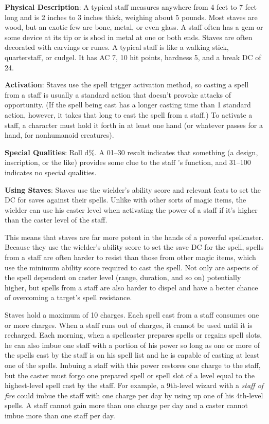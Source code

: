 \textbf{Physical Description}: A typical staff measures anywhere from 4 feet to 7 feet long and is 2 inches to 3 inches thick, weighing about 5 pounds. Most staves are wood, but an exotic few are bone, metal, or even glass. A staff often has a gem or some device at its tip or is shod in metal at one or both ends. Staves are often decorated with carvings or runes. A typical staff is like a walking stick, quarterstaff, or cudgel. It has AC 7, 10 hit points, hardness 5, and a break DC of 24.
				
\textbf{Activation}: Staves use the spell trigger activation method, so casting a spell from a staff is usually a standard action that doesn't provoke attacks of opportunity. (If the spell being cast has a longer casting time than 1 standard action, however, it takes that long to cast the spell from a staff.) To activate a staff, a character must hold it forth in at least one hand (or whatever passes for a hand, for nonhumanoid creatures).
				
\textbf{Special Qualities}: Roll d\%. A 01--30 result indicates that something (a design, inscription, or the like) provides some clue to the staff 's function, and 31--100 indicates no special qualities.
				
\textbf{Using Staves}: Staves use the wielder's ability score and relevant feats to set the DC for saves against their spells. Unlike with other sorts of magic items, the wielder can use his caster level when activating the power of a staff if it's higher than the caster level of the staff. 
				
This means that staves are far more potent in the hands of a powerful spellcaster. Because they use the wielder's ability score to set the save DC for the spell, spells from a staff are often harder to resist than those from other magic items, which use the minimum ability score required to cast the spell. Not only are aspects of the spell dependent on caster level (range, duration, and so on) potentially higher, but spells from a staff are also harder to dispel and have a better chance of overcoming a target's spell resistance.
				
Staves hold a maximum of 10 charges. Each spell cast from a staff consumes one or more charges. When a staff runs out of charges, it cannot be used until it is recharged. Each morning, when a spellcaster prepares spells or regains spell slots, he can also imbue one staff with a portion of his power so long as one or more of the spells cast by the staff is on his spell list and he is capable of casting at least one of the spells. Imbuing a staff with this power restores one charge to the staff, but the caster must forgo one prepared spell or spell slot of a level equal to the highest-level spell cast by the staff. For example, a 9th-level wizard with a \textit{staff of fire} could imbue the staff with one charge per day by using up one of his 4th-level spells. A staff cannot gain more than one charge per day and a caster cannot imbue more than one staff per day.
				
